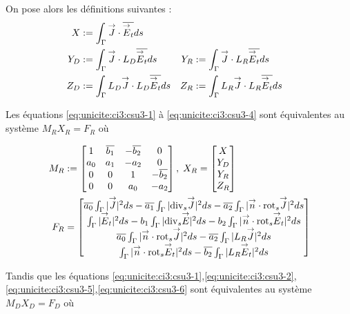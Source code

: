 			On pose alors les définitions suivantes :
			\begin{align*}
				X&:= \int_\Gamma \vJ \cdot \conj{\vE_t} ds\\
				Y_D&:= \int_\Gamma \vJ \cdot L_D \conj{\vE_t} ds
				&Y_R&:= \int_\Gamma \vJ \cdot L_R \conj{\vE_t} ds\\
				Z_D&:= \int_\Gamma L_D \vJ \cdot L_D \conj{\vE_t} ds
				&Z_R&:= \int_\Gamma L_R \vJ \cdot L_R \conj{\vE_t} ds
			\end{align*}

			Les équations \eqref{eq:unicite:ci3:csu3-1} à \eqref{eq:unicite:ci3:csu3-4} sont équivalentes au système $M_R X_R = F_R$ où

			\begin{align*}
				M_R&:=
				\begin{bmatrix}
					1&\conj{b_1}&-\conj{b_2}&0\\
					a_0&a_1&-a_2&0\\
					0&0&1&-\conj{b_2}\\
					0&0&a_0&-a_2\\
				\end{bmatrix},\;
				X_R =
				\begin{bmatrix}
					X\\
					Y_D\\
					Y_R\\
					Z_R
				\end{bmatrix}\\
				F_R &=
				\begin{bmatrix}
					\conj{a_0} \int_\Gamma |\vJ|^2ds - \conj{a_1} \int_\Gamma |\tdivs \vJ|^2 ds - \conj{a_2} \int_\Gamma |\vn \cdot \trots \vJ|^2 ds \\
					\int_\Gamma |\vE_t|^2 ds  - b_1 \int_\Gamma | \tdivs \vE |^2 ds - b_2 \int_\Gamma | \vn \cdot \trots \vE_t|^2 ds \\
					\conj{a_0} \int_\Gamma |\vn \cdot \trots \vJ|^2ds - \conj{a_2} \int_\Gamma | L_R \vJ|^2 ds \\
					\int_\Gamma | \vn \cdot \trots \vE_t |^2 ds  - \conj{b_2} \int_\Gamma | L_R \vE_t|^2 ds
				\end{bmatrix}
			\end{align*}

			Tandis que les équations \eqref{eq:unicite:ci3:csu3-1},\eqref{eq:unicite:ci3:csu3-2},\eqref{eq:unicite:ci3:csu3-5},\eqref{eq:unicite:ci3:csu3-6} sont équivalentes au système $M_D X_D= F_D$ où

